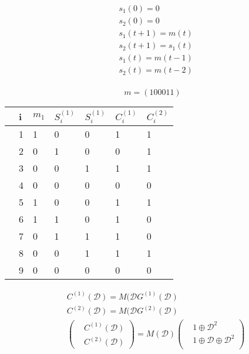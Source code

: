 \documentclass[12pt]{article}
\begin{document}
\begin{align*}
    & s_1(0) = 0 \\
    & s_2(0) = 0 \\ 
    & s_1(t+1) = m(t) \\
    & s_2(t+1) = s_1(t) \\
    & s_1(t) = m(t-1) \\ 
    & s_2(t) = m(t-2) \\
\end{align*}

$$m = (100011) $$

\begin{table}[h]
    \begin{tabular}{lllllll}
        & i & $m_1$ & $S_i^{(1)}$ & $S_i^{(1)}$ & $C_i^{(1)}$ & $C_i^{(2)}$ & \\ \hline
        & 1 & 1     & 0           & 0           & 1           & 1           & \\
        & 2 & 0     & 1           & 0           & 0           & 1           & \\
        & 3 & 0     & 0           & 1           & 1           & 1           & \\
        & 4 & 0     & 0           & 0           & 0           & 0           & \\
        & 5 & 1     & 0           & 0           & 1           & 1           & \\
        & 6 & 1     & 1           & 0           & 1           & 0           & \\
        & 7 & 0     & 1           & 1           & 1           & 0           & \\
        & 8 & 0     & 0           & 1           & 1           & 1           & \\
        & 9 & 0     & 0           & 0           & 0           & 0           & \\
        
    \end{tabular}
\end{table}

\begin{align*}
    & C^{(1)}(\mathcal{D})  = M(\mathcal{D}G^{(1)}(\mathcal{D}) \\
    & C^{(2)}(\mathcal{D})  = M(\mathcal{D}G^{(2)}(\mathcal{D}) \\
    & \begin{pmatrix}
        & C^{(1)}(\mathcal{D}) \\
        & C^{(2)}(\mathcal{D})
    \end{pmatrix} =
    M(\mathcal{D}) \begin{pmatrix}
        & 1 \oplus \mathcal{D}^2 \\
        & 1 \oplus \mathcal{D} \oplus \mathcal{D}^2 \\
    \end{pmatrix}  \\ 
\end{align*}
\end{document}
